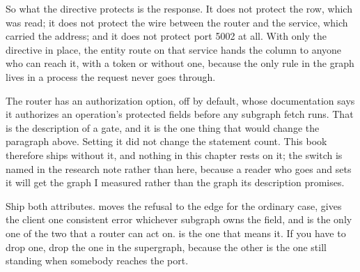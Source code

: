 %
So what the directive protects is the response. It does not protect the row,
which was read; it does not protect the wire between the router and the
service, which carried the address; and it does not protect port 5002 at all.
With only the directive in place, the entity route on that service hands the
column to anyone who can reach it, with a token or without one, because the
only rule in the graph lives in a process the request never goes through.

%
The router has an authorization option, off by default, whose documentation
says it authorizes an operation's protected fields before any subgraph fetch
runs. That is the description of a gate, and it is the one thing that would
change the paragraph above. Setting it did not change the statement count.
This book therefore ships without it, and nothing in this chapter rests on
it; the switch is named in the research note rather than here, because a
reader who goes and sets it will get the graph I measured rather than the
graph its description promises.

%
Ship both attributes. \code{[Authenticated]} moves the refusal to the edge
for the ordinary case, gives the client one consistent error whichever
subgraph owns the field, and is the only one of the two that a router can act
on. \code{[Authorize]} is the one that means it. If you have to drop one,
drop the one in the supergraph, because the other is the one still standing
when somebody reaches the port.
%
